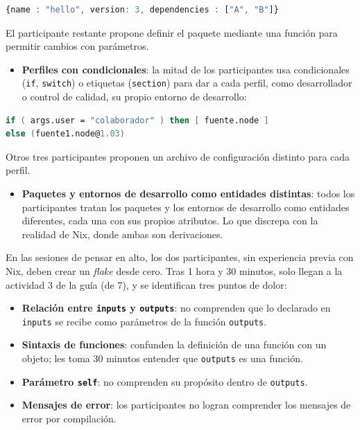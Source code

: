 \begin{bloquecodigo}
\begin{lstlisting}[language=TypeScript]
{name : "hello", version: 3, dependencies : ["A", "B"]}
\end{lstlisting}
\end{bloquecodigo}

El participante restante propone definir el paquete mediante una función para permitir cambios con parámetros.

\begin{itemize}
\item \textbf{Perfiles con condicionales}: la mitad de los participantes usa condicionales (\texttt{if}, \texttt{switch}) o etiquetas (\texttt{section}) para dar a cada perfil, como desarrollador o control de calidad, su propio entorno de desarrollo:
\end{itemize}

\begin{bloquecodigo}
\begin{lstlisting}[language=nix]
if ( args.user = "colaborador" ) then [ fuente.node ]
else (fuente1.node@1.03)
\end{lstlisting}
\end{bloquecodigo}

Otros tres participantes proponen un archivo de configuración distinto para cada perfil.

\begin{itemize}
\item \textbf{Paquetes y entornos de desarrollo como entidades distintas}: todos los participantes tratan los paquetes y los entornos de desarrollo como entidades diferentes, cada una con sus propios atributos. Lo que discrepa con la realidad de Nix, donde ambas son derivaciones.
\end{itemize}

En las sesiones de pensar en alto, los dos participantes, sin experiencia previa con Nix, deben crear un \emph{flake} desde cero. Tras 1 hora y 30 minutos, solo llegan a la actividad 3 de la guía (de 7), y se identifican tres puntos de dolor:

\begin{itemize}
\item \textbf{Relación entre \texttt{inputs} y \texttt{outputs}}: no comprenden que lo declarado en \texttt{inputs} se recibe como parámetros de la función \texttt{outputs}.
\item \textbf{Sintaxis de funciones}: confunden la definición de una función con un objeto; les toma 30 minutos entender que \texttt{outputs} es una función.
\item \textbf{Parámetro \texttt{self}}: no comprenden su propósito dentro de \texttt{outputs}.
\item \textbf{Mensajes de error}: los participantes no logran comprender los mensajes de error por compilación.
\end{itemize}


